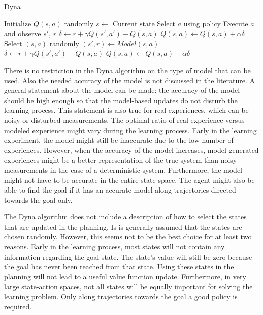 \begin{algorithm}[ht]
	\caption{Dyna} \label{alg:Dyna}
	\begin{algorithmic}[1]
		\State Initialize $Q(s,a)$ randomly
			\State $s\gets \textrm{ Current state}$
			\State Select $a$ using policy
			\State Execute $a$ and observe $s'$, $r$
			\State $\delta \gets r + \gamma Q(s',a') - Q(s,a)$
			\State $Q(s,a) \gets Q(s,a) + \alpha \delta$
				\State Select $(s,a)$ randomly
				\State $(s',r) \gets Model(s,a)$
				\State $\delta \gets r + \gamma Q(s',a') - Q(s,a)$
				\State $Q(s,a) \gets Q(s,a) + \alpha \delta$
			\EndLoop
		\EndFor
	\end{algorithmic}
\end{algorithm}

There is no restriction in the Dyna algorithm on the type of model that can be used. Also the needed accuracy of the model is not discussed in the literature. A general statement about the model can be made: the accuracy of the model should be high enough so that the model-based updates do not disturb the learning process. This statement is also true for real experiences, which can be noisy or disturbed measurements. The optimal ratio of real experience versus modeled experience might vary during the learning process. Early in the learning experiment, the model might still be inaccurate due to the low number of experiences. However, when the accuracy of the model increases, model-generated experiences might be a better representation of the true system than noisy measurements in the case of a deterministic system. Furthermore, the model might not have to be accurate in the entire state-space. The agent might also be able to find the goal if it  has an accurate model along trajectories directed towards the goal only.

%	
	
The Dyna algorithm does not include a description of how to select the states that are updated in the planning. Is is generally assumed that the states are chosen randomly. However, this seems not to be the best choice for at least two reasons. Early in the learning process, most states will not contain any information regarding the goal state. The state's value will still be zero because the goal has never been reached from that state. Using these states in the planning will not lead to a useful value function update. Furthermore, in very large state-action spaces, not all states will be equally important for solving the learning problem. Only along trajectories towards the goal a good policy is required.

